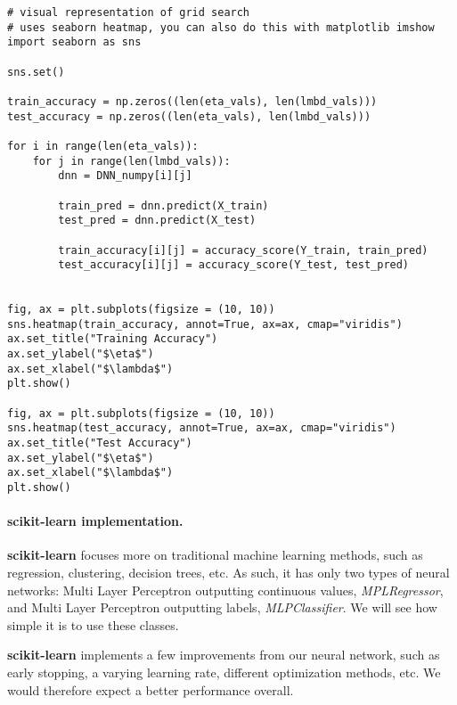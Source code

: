 \begin{verbatim}
# visual representation of grid search
# uses seaborn heatmap, you can also do this with matplotlib imshow
import seaborn as sns

sns.set()

train_accuracy = np.zeros((len(eta_vals), len(lmbd_vals)))
test_accuracy = np.zeros((len(eta_vals), len(lmbd_vals)))

for i in range(len(eta_vals)):
    for j in range(len(lmbd_vals)):
        dnn = DNN_numpy[i][j]
        
        train_pred = dnn.predict(X_train) 
        test_pred = dnn.predict(X_test)

        train_accuracy[i][j] = accuracy_score(Y_train, train_pred)
        test_accuracy[i][j] = accuracy_score(Y_test, test_pred)

        
fig, ax = plt.subplots(figsize = (10, 10))
sns.heatmap(train_accuracy, annot=True, ax=ax, cmap="viridis")
ax.set_title("Training Accuracy")
ax.set_ylabel("$\eta$")
ax.set_xlabel("$\lambda$")
plt.show()

fig, ax = plt.subplots(figsize = (10, 10))
sns.heatmap(test_accuracy, annot=True, ax=ax, cmap="viridis")
ax.set_title("Test Accuracy")
ax.set_ylabel("$\eta$")
ax.set_xlabel("$\lambda$")
plt.show()

\end{verbatim}


\paragraph{scikit-learn implementation.}
\textbf{scikit-learn} focuses more
on traditional machine learning methods, such as regression,
clustering, decision trees, etc. As such, it has only two types of
neural networks: Multi Layer Perceptron outputting continuous values,
\emph{MPLRegressor}, and Multi Layer Perceptron outputting labels,
\emph{MLPClassifier}. We will see how simple it is to use these classes.

\textbf{scikit-learn} implements a few improvements from our neural network,
such as early stopping, a varying learning rate, different
optimization methods, etc. We would therefore expect a better
performance overall.


















